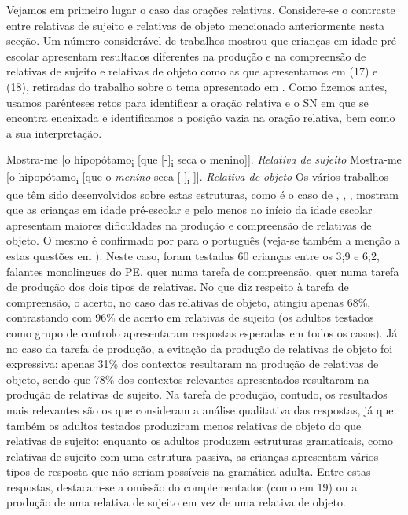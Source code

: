 \documentclass[output=paper,colorlinks,citecolor=brown,booklanguage=portuguese]{langscibook}
\begin{document}
Vejamos em primeiro lugar o caso das orações relativas. Considere-se o contraste entre relativas de sujeito e relativas de objeto mencionado anteriormente nesta secção. Um número considerável de trabalhos mostrou que crianças em idade pré-escolar apresentam resultados diferentes na produção e na compreensão de relativas de sujeito e relativas de objeto como as que apresentamos em (17) e (18), retiradas do trabalho sobre o tema apresentado em \citet{Costa2011}. Como fizemos antes, usamos parênteses retos para identificar a oração relativa e o SN em que se encontra encaixada e identificamos a posição vazia na oração relativa, bem como a sua interpretação.

\ea
    \label{ex:13:17} Mostra-me [o hipopótamo\textsubscript{i} [que [-]\textsubscript{i} seca o menino]]. \emph{Relativa de sujeito}
    \z
    \ea
\label{ex:13:18} Mostra-me [o hipopótamo\textsubscript{i} [que o \emph{menino} seca [-]\textsubscript{i} ]]. \emph{Relativa de objeto}
\z
Os vários trabalhos que têm sido desenvolvidos sobre estas estruturas, como é o caso de \citet{Arosio2006}, \citet{Belletti2010}, \citet{Friedmann2009}, mostram que as crianças em idade pré-escolar e pelo menos no início da idade escolar apresentam maiores dificuldades na produção e compreensão de relativas de objeto. O mesmo é confirmado por \citet{Costa2011} para o português (veja-se também a menção a estas questões em ). Neste caso, foram testadas 60 crianças entre os 3;9 e 6;2, falantes monolingues do PE, quer numa tarefa de compreensão, quer numa tarefa de produção dos dois tipos de relativas. No que diz respeito à tarefa de compreensão, o acerto, no caso das relativas de objeto, atingiu apenas 68\%, contrastando com 96\% de acerto em relativas de sujeito (os adultos testados como grupo de controlo apresentaram respostas esperadas em todos os casos). Já no caso da tarefa de produção, a evitação da produção de relativas de objeto foi expressiva: apenas 31\% dos contextos resultaram na produção de relativas de objeto, sendo que 78\% dos contextos relevantes apresentados resultaram na produção de relativas de sujeito. Na tarefa de produção, contudo, os resultados mais relevantes são os que consideram a análise qualitativa das respostas, já que também os adultos testados produziram menos relativas de objeto do que relativas de sujeito: enquanto os adultos produzem estruturas gramaticais, como relativas de sujeito com uma estrutura passiva, as crianças apresentam vários tipos de resposta que não seriam possíveis na gramática adulta. Entre estas respostas, destacam-se a omissão do complementador (como em 19) ou a produção de uma relativa de sujeito em vez de uma relativa de objeto.
\end{document}
